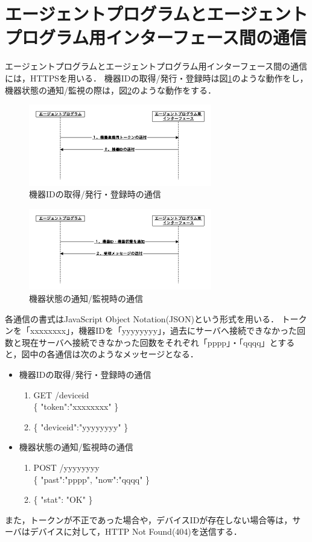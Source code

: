 \section{エージェントプログラムとエージェントプログラム用インターフェース間の通信}
エージェントプログラムとエージェントプログラム用インターフェース間の通信には，HTTPSを用いる．
機器IDの取得/発行・登録時は図\ref{fig:inter_program_regist}のような動作をし，機器状態の通知/監視の際は，図\ref{fig:inter_program_monit}のような動作をする．
\begin{figure}[htbp]
\begin{center}
\includegraphics[width=8cm]{images/inter_program_regist.png}
\caption{機器IDの取得/発行・登録時の通信}
\label{fig:inter_program_regist}
\end{center}
\end{figure}
\begin{figure}[htbp]
\begin{center}
\includegraphics[width=8cm]{images/inter_program_monit.png}
\caption{機器状態の通知/監視時の通信}
\label{fig:inter_program_monit}
\end{center}
\end{figure}

各通信の書式はJavaScript Object Notation(JSON)という形式を用いる．
トークンを「xxxxxxxx」，機器IDを「yyyyyyyy」，過去にサーバへ接続できなかった回数と現在サーバへ接続できなかった回数をそれぞれ「pppp」・「qqqq」とすると，図中の各通信は次のようなメッセージとなる．
\begin{itemize}
\item 機器IDの取得/発行・登録時の通信
	\begin{enumerate}
		\item GET /deviceid\\
			\{ "token":"xxxxxxxx" \}
		\item \{ "deviceid":"yyyyyyyy" \}
	\end{enumerate}
\item 機器状態の通知/監視時の通信
	\begin{enumerate}
		\item POST /yyyyyyyy\\
			\{ "past":"pppp", "now":"qqqq" \}
		\item \{ "stat": "OK" \}
	\end{enumerate}
\end{itemize}
また，トークンが不正であった場合や，デバイスIDが存在しない場合等は，サーバはデバイスに対して，HTTP Not Found(404)を送信する．


